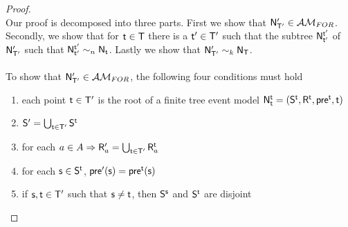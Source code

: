 \begin{proof}
\[\]
Our proof is decomposed into three parts.
First we show that $\evM'_{\evT'} \in \forestClass$.
Secondly, we show that for $\evt \in \evT$ there is a $\evt' \in \evT'$ such that the subtree $\evM^{\evt'}_{\evt'}$ of
$\evM'_{\evT'}$ such that $\evM^{\evt'}_{\evt'} \sim_n \evM_\evt$.
Lastly we show that $\evM'_{\evT'} \sim_k \evM_\evT$.\\
\\
To show that $\evM'_{\evT'} \in \forestClass$, the following four conditions must hold
\begin{enumerate}
	\item each point $\evt \in \evT'$ is the root of a finite tree event model $\evM^\evt_\evt = (\evS^\evt, \evR^\evt, \evpr^\evt, \evt)$ \label{forestConOne}
  \item $\evS' = \bigcup_{\evt \in \evT'} \evS^\evt$ \label{forestConTwo}
  \item for each $a \in A \Rightarrow \evR'_a = \bigcup_{\evt \in \evT'} \evR^\evt_a$ \label{forestConFive}
	\item for each $\evs \in \evS^\evt$, $\evpr'(\evs) = \evpr^\evt(\evs)$ \label{forestConThree}
	\item if $\evs, \evt \in \evT'$ such that $\evs \neq \evt$, then $\evS^\evs$ and $\evS^\evt$ are disjoint
	\label{forestConFour}
\end{enumerate}


\end{proof}
